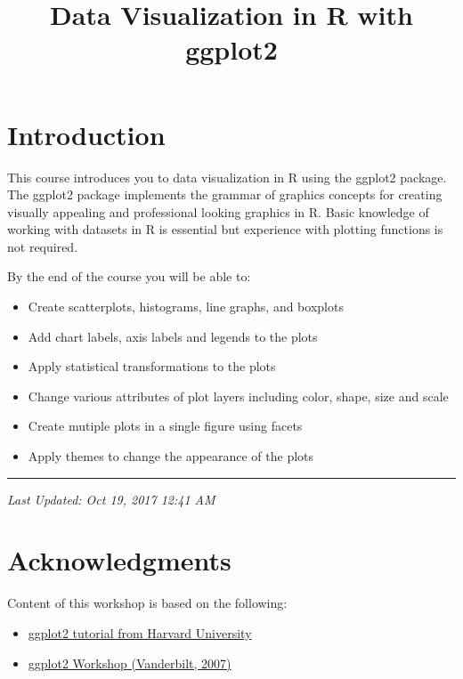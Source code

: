 \documentclass[]{article}
\title{Data Visualization in R with ggplot2}
\author{}
\date{}
\providecommand{\tightlist}{%
  \setlength{\itemsep}{0pt}\setlength{\parskip}{0pt}}
\theoremstyle{definition}
\theoremstyle{definition}
\theoremstyle{definition}
\theoremstyle{remark}
\begin{document}
\maketitle

{
\setcounter{tocdepth}{2}
\tableofcontents
}
\section{Introduction}\label{introduction}

This course introduces you to data visualization in R using the ggplot2
package. The ggplot2 package implements the grammar of graphics concepts
for creating visually appealing and professional looking graphics in R.
Basic knowledge of working with datasets in R is essential but
experience with plotting functions is not required.

By the end of the course you will be able to:

\begin{itemize}
\tightlist
\item
  Create scatterplots, histograms, line graphs, and boxplots
\item
  Add chart labels, axis labels and legends to the plots
\item
  Apply statistical transformations to the plots
\item
  Change various attributes of plot layers including color, shape, size
  and scale
\item
  Create mutiple plots in a single figure using facets
\item
  Apply themes to change the appearance of the plots
\end{itemize}

\begin{center}\rule{0.5\linewidth}{\linethickness}\end{center}

\emph{Last Updated: Oct 19, 2017 12:41 AM}

\section{Acknowledgments}\label{acknowledgments}

Content of this workshop is based on the following:

\begin{itemize}
\tightlist
\item
  \href{http://tutorials.iq.harvard.edu/R/Rgraphics/Rgraphics.html}{ggplot2
  tutorial from Harvard University}
\item
  \href{http://ggplot2.org/resources/2007-vanderbilt.pdf}{ggplot2
  Workshop (Vanderbilt, 2007)}
\end{itemize}
\end{document}

